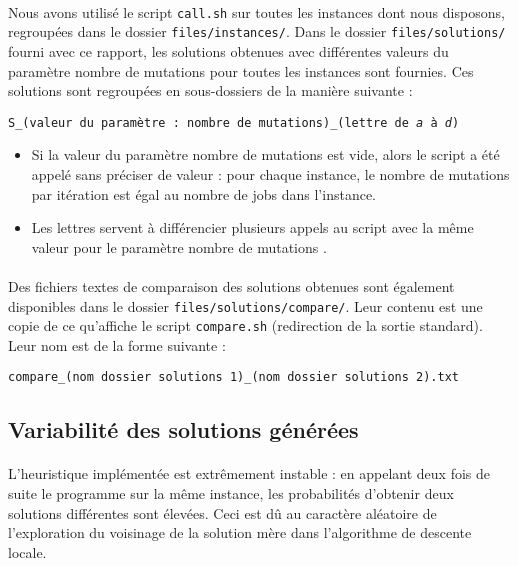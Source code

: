 \paragraph{}
Nous avons utilisé le script \texttt{call.sh} sur toutes les instances dont nous disposons, regroupées dans le dossier \texttt{files/instances/}.
Dans le dossier \texttt{files/solutions/} fourni avec ce rapport, les solutions obtenues avec différentes valeurs du paramètre \og nombre de mutations \fg{} pour toutes les instances sont fournies. Ces solutions sont regroupées en sous-dossiers de la manière suivante :
\begin{center}
\texttt{S\_(valeur du paramètre : nombre de mutations)\_(lettre de \emph{a} à \emph{d})}
\end{center}
\begin{itemize}
\item Si la valeur du paramètre \og nombre de mutations \fg{} est vide, alors le script a été appelé sans préciser de valeur :
pour chaque instance, le nombre de mutations par itération est égal au nombre de jobs dans l'instance.
\item Les lettres servent à différencier plusieurs appels au script avec la même valeur pour le paramètre \og nombre de mutations \fg{}.
\end{itemize}

\paragraph{}
Des fichiers textes de comparaison des solutions obtenues sont également disponibles dans le dossier \texttt{files/solutions/compare/}.
Leur contenu est une copie de ce qu'affiche le script \texttt{compare.sh} (redirection de la sortie standard).
Leur nom est de la forme suivante :
\begin{center}
\texttt{compare\_(nom dossier solutions 1)\_(nom dossier solutions 2).txt}
\end{center}

\subsection{Variabilité des solutions générées}

\paragraph{}
L'heuristique implémentée est extrêmement instable : en appelant deux fois de suite le programme sur la même instance, les probabilités
d'obtenir deux solutions différentes sont élevées. Ceci est dû au caractère aléatoire de l'exploration du voisinage de la solution mère
dans l'algorithme de descente locale.

